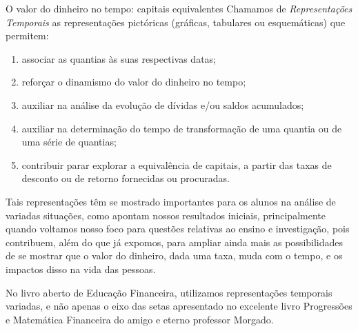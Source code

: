 \begin{paginatexto}{O valor do dinheiro no tempo: capitais equivalentes}
  Chamamos de \textit{Representações Temporais} as representações pictóricas (gráficas, tabulares ou esquemáticas) que permitem:
  \begin{enumerate}
    \item associar as quantias às suas respectivas datas;
    \item reforçar o dinamismo do valor do dinheiro no tempo;
    \item auxiliar na análise da evolução de dívidas e/ou saldos acumulados;
    \item auxiliar na determinação do tempo de transformação de uma quantia ou de uma série de quantias;
    \item contribuir parar explorar a equivalência de capitais, a partir das taxas de desconto ou de retorno fornecidas ou procuradas.
  \end{enumerate}

Tais representações têm se mostrado importantes para os alunos na análise de variadas situações, como apontam nossos resultados iniciais, principalmente quando voltamos nosso foco para questões relativas ao ensino e investigação, pois contribuem, além do que já expomos, para ampliar ainda mais as possibilidades de se mostrar que o valor do dinheiro, dada uma taxa, muda com o tempo, e os impactos disso na vida das pessoas.

No livro aberto de Educação Financeira, utilizamos representações temporais variadas, e não apenas o eixo das setas apresentado no excelente livro Progressões e Matemática Financeira do amigo e eterno professor Morgado.
\end{paginatexto}
\clearpage

